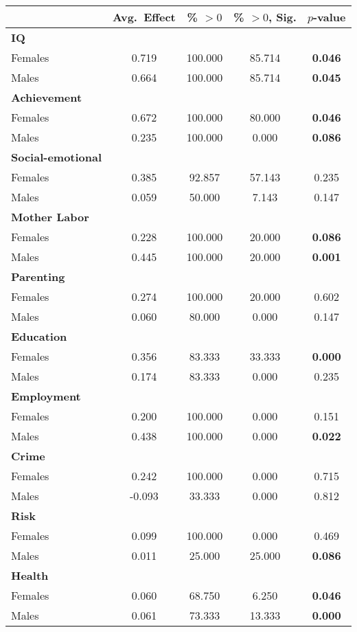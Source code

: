 
\begin{tabular}{lcccc}
\toprule
& Avg.\ Effect & \% $>0$ & \% $>0$, Sig. & $p$-value \\
\midrule
\textbf{IQ}  &  & &  & \\
\quad Females &     0.719 &   100.000 &    85.714 &     \textbf{0.046} \\
\quad Males &     0.664 &   100.000 &    85.714  &     \textbf{0.045}  \\
 \midrule
\textbf{Achievement}  & & & & \\
\quad Females 	&     0.672 &   100.000 &    80.000&     \textbf{0.046} \\
\quad Males 	& 0.235 &   100.000 &     0.000 &     \textbf{0.086} \\  
 \midrule
\textbf{Social-emotional}  & & & & \\
\quad Females 	&     0.385 &      92.857&    57.143&     0.235 \\
\quad Males 	& 0.059 &  50.000&     7.143 &     0.147 \\
 \midrule
\textbf{Mother Labor}  & & & & \\
\quad Females &     0.228 &   100.000&    20.000 &     \textbf{0.086} \\
\quad Males &     0.445   &   100.000  &    20.000  &     \textbf{0.001} \\  
 \midrule
\textbf{Parenting}   & & & & \\
\quad Females &     0.274 &   100.000 &    20.000 &     0.602 \\
\quad Males &     0.060 &    80.000  &     0.000 & 0.147 \\  
 \midrule
\textbf{Education}  & & & & \\
\quad Females &     0.356 &    83.333 &    33.333 &     \textbf{0.000} \\
\quad Males &     0.174   &    83.333 &     0.000   &     0.235 \\  
 \midrule
\textbf{Employment}   & & & & \\
\quad Females &     0.200 &   100.000 &     0.000 &     0.151 \\
\quad Males &     0.438   &   100.000 &     0.000   &     \textbf{0.022} \\  
 \midrule
\textbf{Crime}   & & & & \\
\quad Females &     0.242 &   100.000 &     0.000  &     0.715 \\
\quad Males &    -0.093 &    33.333  &     0.000 & 0.812 \\  
 \midrule
\textbf{Risk}  & & & & \\
 \quad Females &     0.099 &   100.000 &     0.000  &     0.469 \\
 \quad Males &     0.011 &    25.000  &    25.000 &     \textbf{0.086} \\  
 \midrule
\textbf{Health}   & & & & \\
 \quad Females &     0.060   &    68.750 &     6.250 &     \textbf{0.046} \\
 \quad Males &     0.061  &    73.333 &    13.333  &     \textbf{0.000} \\  
\bottomrule
\end{tabular}

